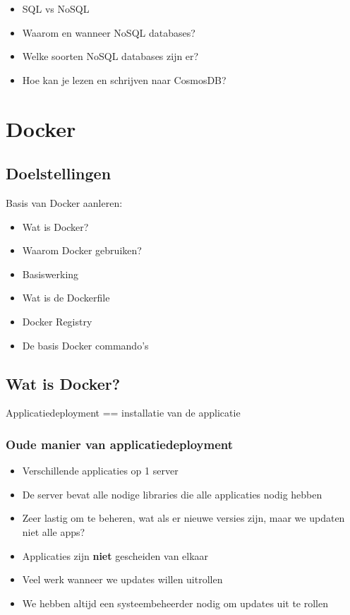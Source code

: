 \documentclass{article}
\newcommand{\bold}[1]{\textbf{#1}}
\begin{document}
\begin{itemize}
    \item SQL vs NoSQL
    \item Waarom en wanneer NoSQL databases?
    \item Welke soorten NoSQL databases zijn er?
    \item Hoe kan je lezen en schrijven naar CosmosDB?
\end{itemize}

\section{Docker}

\subsection{Doelstellingen}

Basis van Docker aanleren:

\begin{itemize}
    \item Wat is Docker?
    \item Waarom Docker gebruiken?
    \item Basiswerking
    \item Wat is de Dockerfile
    \item Docker Registry
    \item De basis Docker commando's
\end{itemize}

\subsection{Wat is Docker?}

Applicatiedeployment == installatie van de applicatie

\subsubsection{Oude manier van applicatiedeployment}

\begin{itemize}
    \item Verschillende applicaties op 1 server
    \item De server bevat alle nodige libraries die alle applicaties nodig hebben
    \item Zeer lastig om te beheren, wat als er nieuwe versies zijn, maar we updaten niet alle apps?
    \item Applicaties zijn \bold{niet} gescheiden van elkaar
    \item Veel werk wanneer we updates willen uitrollen
    \item We hebben altijd een systeembeheerder nodig om updates uit te rollen
\end{itemize}
\end{document}
